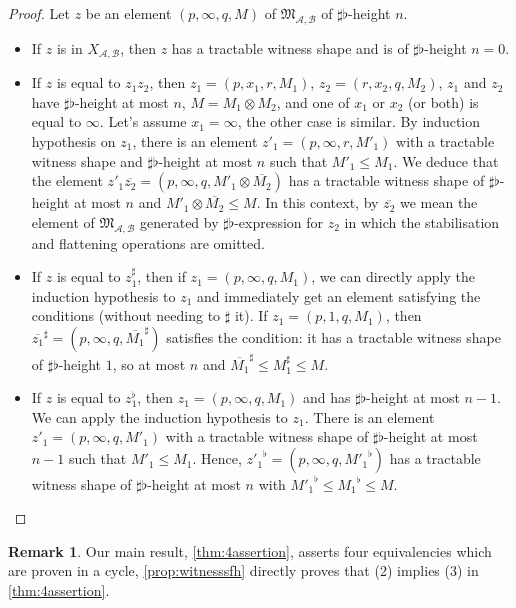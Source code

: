 \documentclass[10pt,a4paper]{amsart}
\theoremstyle{definition}
\newtheorem{rem}[rem]{Remark}
\numberwithin{equation}{section}
\theoremstyle{remark}
\newcommand{\ideal}{\mathfrak{M}}
\newcommand{\autA}{\mathcal{A}}
\newcommand{\autB}{\mathcal{B}}
\theoremstyle{remark}
\begin{document}
\begin{proof}
Let $z$ be an element $(p,\infty,q,M)$ of $\ideal_{\autA,\autB}$ of $\sharp\flat$-height $n$.
\begin{itemize}
\item If $z$ is in $X_{\autA,\autB}$, then $z$ has a tractable witness shape and is of $\sharp\flat$-height $n=0$.
\item If $z$ is equal to $z_1z_2$, then $z_1= (p,x_1,r,M_1)$, $z_2 = (r,x_2,q,M_2)$, $z_1$ and $z_2$ have $\sharp\flat$-height at most $n$, $M=M_1\otimes M_2$, and one of $x_1$ or $x_2$ (or both) is equal to $\infty$. Let's assume $x_1 = \infty$, the other case is similar. By induction hypothesis on $z_1$, there is an element $z'_1 = (p,\infty,r,M'_1)$ with a tractable witness shape and $\sharp\flat$-height at most $n$ such that $M'_1 \leq M_1$. We deduce that the element $z'_1\overline{z_2} = (p,\infty,q,M'_1\otimes \overline{M_2})$ has a tractable witness shape of $\sharp\flat$-height at most $n$ and $M'_1\otimes \overline{M_2} \leq M$. In this context, by $\overline{z_2}$ we mean the element of $\ideal_{\autA,\autB}$ generated by $\sharp\flat$-expression for $z_2$ in which the stabilisation and flattening operations are omitted. 
\item  If $z$ is equal to $z_1^\sharp$, then if $z_1= (p,\infty,q,M_1)$, we can directly apply the induction hypothesis to $z_1$ and immediately get an element satisfying the conditions (without needing to $\sharp$ it). If $z_1= (p,1,q,M_1)$, then $\overline{z_1}^\sharp = (p,\infty,q,\overline{M_1}^\sharp)$ satisfies the condition: it has a tractable witness shape of $\sharp\flat$-height $1$, so at most $n$ and $\overline{M_1}^\sharp \leq M_1^\sharp \leq M$.
\item If $z$ is equal to $z_1^\flat$, then $z_1= (p,\infty,q,M_1)$ and has $\sharp\flat$-height at most $n-1$. We can apply the induction hypothesis to $z_1$. There is an element $z'_1 = (p,\infty,q,M'_1)$ with a tractable witness shape of $\sharp\flat$-height at most $n-1$ such that $M'_1 \leq M_1$. Hence, ${z'_1}^\flat = (p,\infty,q,{M'_1}^\flat)$ has a tractable witness shape of $\sharp\flat$-height at most $n$ with ${M'_1}^\flat \leq {M_1}^\flat \leq M$.  \qedhere
\end{itemize}
\end{proof}

\begin{rem}
Our main result, \cref{thm:4assertion}, asserts four equivalencies which are proven in a cycle,
    \cref{prop:witnesssfh} directly proves that (2) implies (3) in \cref{thm:4assertion}.
\end{rem}
\end{document}
